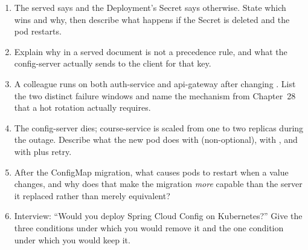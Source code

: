 \begin{quiz}
\begin{enumerate}
  \item The served  says
   and the Deployment's Secret says otherwise. State
  which wins and why, then describe what happens if the Secret is
  deleted and the pod restarts.
  \item Explain why  in a
  served document is not a precedence rule, and what the config-server
  actually sends to the client for that key.
  \item A colleague runs  on both
  auth-service and api-gateway after changing . List
  the two distinct failure windows and name the mechanism from
  Chapter~28 that a hot rotation actually requires.
  \item The config-server dies; course-service is scaled from one to
  two replicas during the outage. Describe what the new pod does with
   (non-optional), with ,
  and with  plus retry.
  \item After the ConfigMap migration, what causes pods to restart when
  a value changes, and why does that make the migration \emph{more}
  capable than the server it replaced rather than merely equivalent?
  \item Interview: ``Would you deploy Spring Cloud Config on Kubernetes?''
  Give the three conditions under which you would remove it and the
  one condition under which you would keep it.
\end{enumerate}
\end{quiz}
